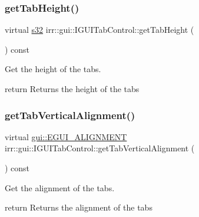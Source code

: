 \subsubsection{\texorpdfstring{get\+Tab\+Height()}{getTabHeight()}}
{\footnotesize\ttfamily virtual \hyperlink{namespaceirr_ac66849b7a6ed16e30ebede579f9b47c6}{s32} irr\+::gui\+::\+I\+G\+U\+I\+Tab\+Control\+::get\+Tab\+Height (\begin{DoxyParamCaption}{ }\end{DoxyParamCaption}) const\hspace{0.3cm}{\ttfamily [pure virtual]}}



Get the height of the tabs. 

return Returns the height of the tabs \mbox{\label{classirr_1_1gui_1_1IGUITabControl_a3153a7dba26548eda6a8013e1e669c18}} 
\subsubsection{\texorpdfstring{get\+Tab\+Vertical\+Alignment()}{getTabVerticalAlignment()}}
{\footnotesize\ttfamily virtual \hyperlink{namespaceirr_1_1gui_a19eb5fb40e67f108cb16aba922ddaa2d}{gui\+::\+E\+G\+U\+I\+\_\+\+A\+L\+I\+G\+N\+M\+E\+NT} irr\+::gui\+::\+I\+G\+U\+I\+Tab\+Control\+::get\+Tab\+Vertical\+Alignment (\begin{DoxyParamCaption}{ }\end{DoxyParamCaption}) const\hspace{0.3cm}{\ttfamily [pure virtual]}}



Get the alignment of the tabs. 

return Returns the alignment of the tabs \mbox{\label{classirr_1_1gui_1_1IGUITabControl_a7ee37817344a547a240b751e3386b85b}} 
